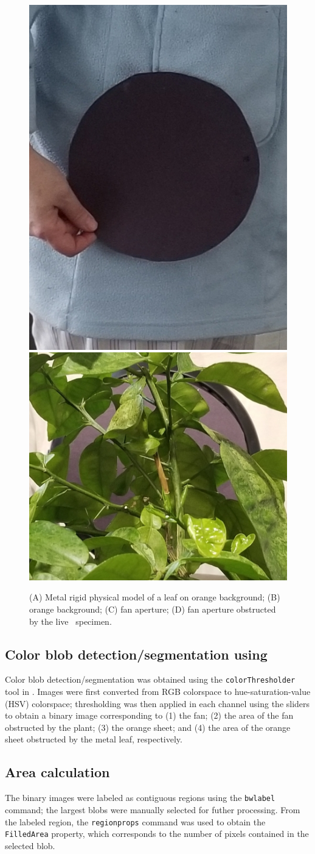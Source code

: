 \begin{figure}
\begin{center}
\includegraphics[width=0.49\columnwidth]{figures/Fan1.jpg}
\includegraphics[width=0.49\columnwidth]{figures/Fan.jpg}
\end{center}
\caption{(A) Metal rigid physical model of a leaf on orange background; (B) orange background; (C) fan aperture; (D) fan aperture obstructed by the live \Cxparadisi\ specimen.}
\label{fig:app:images}
\end{figure}


\subsection{Color blob detection/segmentation using \Matlab}
Color blob detection/segmentation was obtained using the \lstinline{colorThresholder} tool in \Matlab. Images were first converted from RGB colorspace to hue-saturation-value (HSV) colorspace; thresholding was then applied in each channel using the sliders to obtain a binary image corresponding to (1) the fan; (2) the area of the fan obstructed by the plant; (3) the orange sheet; and (4) the area of the orange sheet obstructed by the metal leaf, respectively. 

\subsection{Area calculation}
The binary images were labeled as contiguous regions using the \lstinline{bwlabel} command; the largest blobs were manually selected for futher processing. From the labeled region, the \lstinline{regionprops} command was used to obtain the \lstinline{FilledArea} property, which corresponds to the number of pixels contained in the selected blob. 

